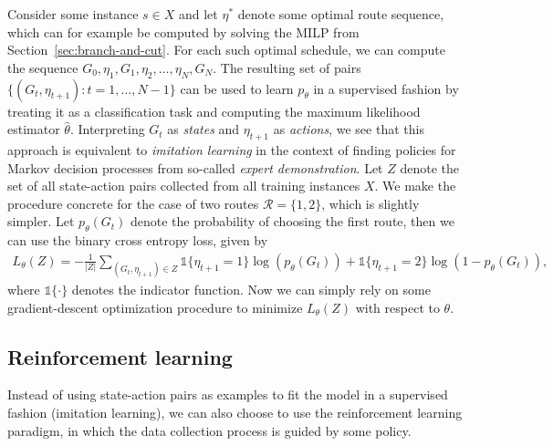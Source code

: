 \documentclass[a4paper]{article}
\theoremstyle{definition}
\theoremstyle{plain}
\begin{document}
Consider some instance $s \in X$ and let $\eta^{*}$ denote some optimal route
sequence, which can for example be computed by solving the MILP from
Section~\ref{sec:branch-and-cut}. For each such optimal schedule, we can compute
the sequence $G_{0}, \eta_{1}, G_{1}, \eta_{2}, \dots, \eta_{N}, G_{N}$. The
resulting set of pairs $\{ (G_{t}, \eta_{t+1}) : t = 1, \dots, N - 1 \}$ can be used to
learn $p_{\theta}$ in a supervised fashion by treating it as a classification task
and computing the maximum likelihood estimator $\hat{\theta}$. Interpreting $G_{t}$
as \textit{states} and $\eta_{t+1}$ as \textit{actions}, we see that this
approach is equivalent to \textit{imitation learning} in the context of finding
policies for Markov decision processes from so-called \textit{expert
  demonstration}.
%
Let $Z$ denote the set of all state-action pairs collected from all
training instances $X$. We make the procedure concrete for the case of two
routes $\mathcal{R} = \{ 1, 2 \}$, which is slightly simpler. Let $p_{\theta}(G_{t})$
denote the probability of choosing the first route, then we can use the binary
cross entropy loss, given by
\begin{align*}
  L_{\theta}(Z) = - \frac{1}{|Z|} \sum_{(G_{t}, \eta_{t+1}) \in Z} \mathds{1}\{\eta_{t+1} = 1\} \log(p_{\theta}(G_{t})) + \mathds{1}\{\eta_{t+1} = 2\} \log(1 - p_{\theta}(G_{t})) ,
\end{align*}
where $\mathds{1}\{\cdot\}$ denotes the indicator function. Now we can simply rely on
some gradient-descent optimization procedure to minimize $L_{\theta}(Z)$ with
respect to $\theta$.

\subsection{Reinforcement learning}

Instead of using state-action pairs as examples to fit the model in a supervised
fashion (imitation learning), we can also choose to use the reinforcement
learning paradigm, in which the data collection process is guided by some
policy.
\end{document}
